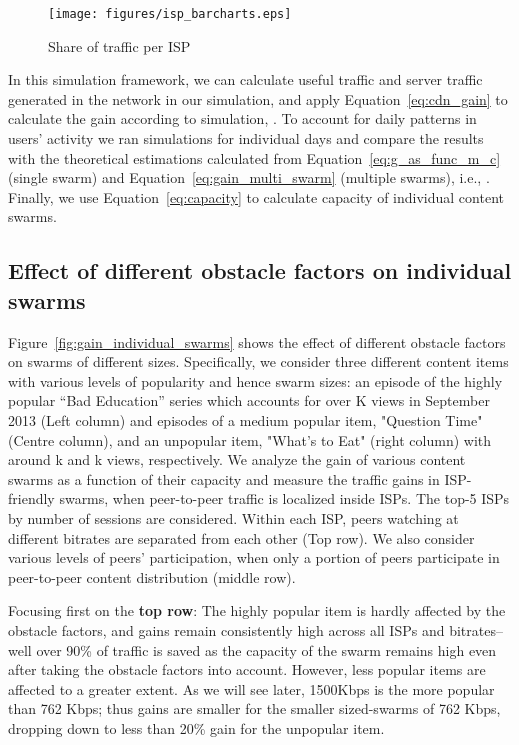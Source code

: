 \documentclass[10pt, conference, letterpaper]{IEEEtran}
\begin{document}
\begin{figure}
\centering
      \texttt{[image: figures/isp\_barcharts.eps]}
      \caption{Share of traffic per ISP}\vspace{-4mm}
      \label{fig:ispsplit}
\end{figure}


In this simulation framework, we can calculate useful traffic  and server  traffic generated in the network in our simulation, and apply Equation~\ref{eq:cdn_gain} to calculate the gain according to simulation, . To account for daily patterns in users' activity we ran simulations for individual days
and compare the results with the theoretical estimations calculated from Equation~\ref{eq:g_as_func_m_c} (single swarm) and Equation~\ref{eq:gain_multi_swarm} (multiple swarms), i.e., . Finally, we use Equation~\ref{eq:capacity} to calculate capacity  of individual content swarms. 


\subsection{Effect of different obstacle factors on individual swarms}

Figure~\ref{fig:gain_individual_swarms} shows the effect of different obstacle factors on swarms of different sizes. Specifically, we consider three different content items with various levels of popularity and hence swarm sizes: an episode of the highly popular ``Bad Education'' series which accounts for over K views in September 2013 (Left column) and episodes of a medium popular item, "Question Time" (Centre column), and an unpopular item, "What's to Eat"  (right column) with around k and k views, respectively.  We analyze the gain of various content swarms as a function of their capacity and measure the traffic gains in ISP-friendly swarms, when peer-to-peer traffic is localized inside ISPs. The top-5 ISPs by number of sessions  are considered. Within each  ISP, peers  watching at different bitrates are separated from each other (Top row). We also consider various levels of peers' participation, when only a portion of peers participate in peer-to-peer content distribution (middle row). 


Focusing first on the \textbf{top row}: The highly popular item is hardly affected by the obstacle factors, and gains remain consistently high across all ISPs and bitrates--well over 90\% of traffic is saved as the capacity of the swarm remains high even after taking the obstacle factors into account. However, less popular items are affected to a greater extent. As we will see later, 1500Kbps is the more popular than 762 Kbps; thus gains are smaller for the smaller sized-swarms of 762 Kbps, dropping down to less than 20\% gain for the unpopular item. 
\end{document}
